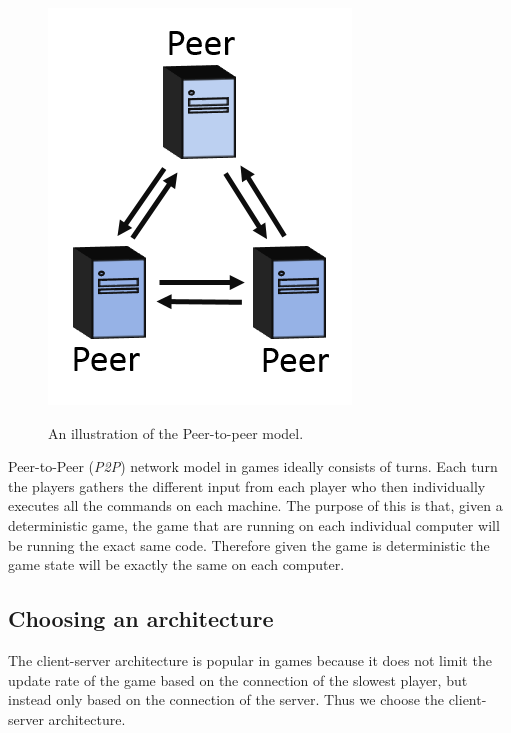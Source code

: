 \begin{figure}[H]
\centering
\includegraphics[scale=1]{figures/network/peer_peer}
\label{fig:peer_peer}
\caption{An illustration of the Peer-to-peer model.}
\end{figure}

Peer-to-Peer (\textit{P2P}) network model in games ideally consists of turns.
Each turn the players gathers the different input from each player who then individually executes all the commands on each machine.
The purpose of this is that, given a deterministic game, the game that are running on each individual computer will be running the exact same code. 
Therefore given the game is deterministic the game state will be exactly the same on each computer. 

\subsection{Choosing an architecture}
The client-server architecture is popular in games because it does not limit the update rate of the game based on the connection of the slowest player, but instead only based on the connection of the server.
Thus we choose the client-server architecture.